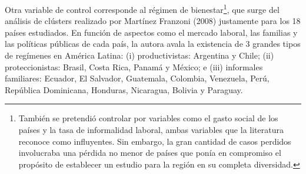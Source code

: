 \documentclass[12pt,letterpaper]{article}
\begin{document}
Otra variable de control corresponde al régimen de bienestar\footnote{También se pretendió controlar por variables como el gasto social de los países y la tasa de informalidad laboral, ambas variables que la literatura reconoce como influyentes. Sin embargo, la gran cantidad de casos perdidos involucraba una pérdida no menor de países que ponía en compromiso el propósito de establecer un estudio para la región en su completa diversidad.}, que surge del análisis de clústers realizado por Martínez Franzoni (2008)  justamente para los 18 países estudiados. En función de aspectos como el mercado laboral, las familias y las políticas públicas de cada país, la autora avala la existencia de 3 grandes tipos de regímenes en América Latina: (i) productivistas: Argentina y Chile; (ii) proteccionistas: Brasil, Costa Rica, Panamá y México; e (iii) informales familiares: Ecuador, El Salvador, Guatemala, Colombia, Venezuela, Perú, República Dominicana, Honduras, Nicaragua, Bolivia y Paraguay.
\end{document}
